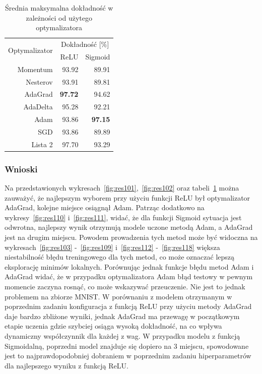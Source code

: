 \documentclass{article}
\begin{document}
\begin{table}[H]
	\caption{Średnia maksymalna dokładność w zależności od użytego optymalizatora}
	\label{tabela-res-11}
	\centering
	\begin{tabular}{rrr}
		\toprule
		\multirow{2}{*}{Optymalizator} & \multicolumn{2}{c}{Dokładność [\%]} \\
		         & ReLU           & Sigmoid        \\
		\midrule
		Momentum & 93.92          & 89.91          \\
		Nesterov & 93.91          & 89.81          \\
		AdaGrad  & \textbf{97.72} & 94.62          \\
		AdaDelta & 95.28          & 92.21          \\
		Adam     & 93.86          & \textbf{97.15} \\
		SGD      & 93.86          & 89.89          \\
		Lista 2  & 97.70          & 93.29          \\
		\bottomrule
	\end{tabular}
\end{table}

\subsubsection*{Wnioski}
Na przedstawionych wykresach~\ref{fig:res101},~\ref{fig:res102} oraz tabeli~\ref{tabela-res-11} można zauważyć, że najlepszym wyborem przy użyciu funkcji ReLU był optymalizator AdaGrad, kolejne miejsce osiągnął Adam. Patrząc dodatkowo na wykresy~\ref{fig:res110} i~\ref{fig:res111}, widać, że dla funkcji Sigmoid sytuacja jest odwrotna, najlepszy wynik otrzymują modele uczone metodą Adam, a AdaGrad jest na drugim miejscu. Powodem prowadzenia tych metod może być widoczna na wykresach~\ref{fig:res103} -~\ref{fig:res109} i~\ref{fig:res112} -~\ref{fig:res118} większa niestabilność błędu treningowego dla tych metod, co może oznaczać lepszą eksplorację minimów lokalnych. Porównując jednak funkcje błędu metod Adam i AdaGrad widać, że w przypadku optymalizatora Adam błąd testowy w pewnym momencie zaczyna rosnąć, co może wskazywać przeuczenie. Nie jest to jednak problemem na zbiorze MNIST. W porównaniu z modelem otrzymanym w poprzednim zadaniu konfiguracja z funkcją ReLU przy użyciu metody AdaGrad daje bardzo zbliżone wyniki, jednak AdaGrad ma przewagę w początkowym etapie uczenia gdzie szybciej osiąga wysoką dokładność, na co wpływa dynamiczny współczynnik dla każdej z wag. W przypadku modelu z funkcją Sigmoidalną, poprzedni model znajduje się dopiero na 3 miejscu, spowodowane jest to najprawdopodobniej dobraniem w poprzednim zadaniu hiperparametrów dla najlepszego wyniku z funkcją ReLU. 
\end{document}
